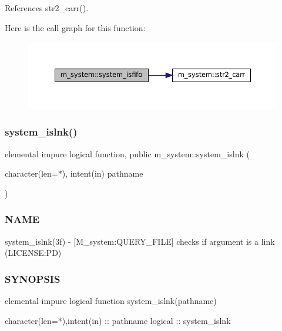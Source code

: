References str2\+\_\+carr().

Here is the call graph for this function\+:\nopagebreak
\begin{figure}[H]
\begin{center}
\leavevmode
\includegraphics[width=350pt]{namespacem__system_aa2bdb5f75405d87934c10756b539d082_cgraph}
\end{center}
\end{figure}
\mbox{\label{namespacem__system_a268d0cd27be36527894fe2cae0f1b9f6}} 
\subsubsection{\texorpdfstring{system\+\_\+islnk()}{system\_islnk()}}
{\footnotesize\ttfamily elemental impure logical function, public m\+\_\+system\+::system\+\_\+islnk (\begin{DoxyParamCaption}\item[{character(len=$\ast$), intent(in)}]{pathname }\end{DoxyParamCaption})}



\subsubsection*{N\+A\+ME}

system\+\_\+islnk(3f) -\/ \mbox{[}M\+\_\+system\+:Q\+U\+E\+R\+Y\+\_\+\+F\+I\+LE\mbox{]} checks if argument is a link (L\+I\+C\+E\+N\+SE\+:PD) 

\subsubsection*{S\+Y\+N\+O\+P\+S\+IS}

\begin{DoxyVerb}elemental impure logical function system_islnk(pathname)

character(len=*),intent(in) :: pathname
logical                     :: system_islnk
\end{DoxyVerb}


